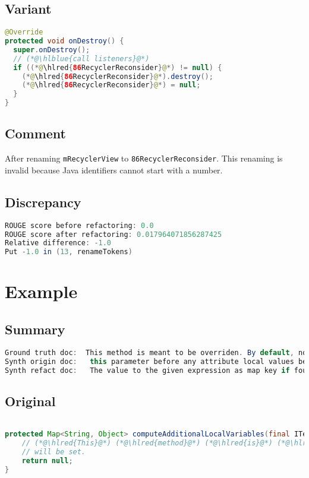\documentclass[11pt]{article}
\DeclareRobustCommand{\hlred}[1]{{\sethlcolor{YellowOrange}\hl{#1}}}
\DeclareRobustCommand{\hlblue}[1]{{\sethlcolor{SeaGreen}\hl{#1}}}
\DeclareRobustCommand{\hlblue}[1]{{\sethlcolor{SkyBlue}\hl{#1}}}
\begin{document}
\subsection{Variant}

\begin{lstlisting}[language=java]
@Override
protected void onDestroy() {
  super.onDestroy();
  // (*@\hlblue{call listeners}@*)
  if ((*@\hlred{86RecyclerReconsider}@*) != null) {
    (*@\hlred{86RecyclerReconsider}@*).destroy();
    (*@\hlred{86RecyclerReconsider}@*) = null;
  }
}
\end{lstlisting}
\subsection{Comment}

After renaming \texttt{mRecyclerView} to \texttt{86RecyclerReconsider}. This renaming is invalid because Java identifiers cannot start with a number.

\subsection{Discrepancy}

\begin{lstlisting}[language=java]
ROUGE score before refactoring: 0.0
ROUGE score after refactoring: 0.017964071856287425
Relative difference: -1.0
Put -1.0 in (13, renameTokens)
\end{lstlisting}


\pagebreak
\section{Example}
\subsection{Summary}

\begin{lstlisting}[language=java]
Ground truth doc:  This method is meant to be overriden. By default, no local variables
Synth origin doc:   this parameter before any attribute local values before tag parsing is executed is not
Synth refact doc:   The value to the given expression as map key if found then value as
\end{lstlisting}

\subsection{Original}
\begin{lstlisting}[language=java]

protected Map<String, Object> computeAdditionalLocalVariables(final ITemplateContext context, final IProcessableElementTag tag, final AttributeName attributeName, final String attributeValue, final IStandardExpression expression) {
    // (*@\hlred{This}@*) (*@\hlred{method}@*) (*@\hlred{is}@*) (*@\hlred{meant}@*) (*@\hlred{to}@*) (*@\hlred{be}@*) (*@\hlred{overriden.}@*) (*@\hlred{By}@*) (*@\hlred{default,}@*) (*@\hlred{no}@*) (*@\hlred{local}@*) (*@\hlred{variables}@*)
    // will be set.
    return null;
}
\end{lstlisting}
\end{document}
